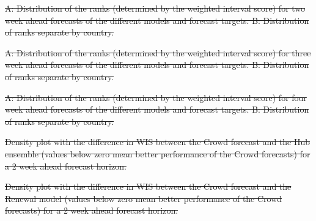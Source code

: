 \documentclass[10pt,letterpaper]{article}
\providecommand{\DIFdeltex}[1]{{\protect\color{red}\sout{#1}}}                      %
\providecommand{\DIFdelFL}[1]{\DIFdel{#1}} %
\providecommand{\DIFdel}[1]{\texorpdfstring{\DIFdeltex{#1}}{}} %
\begin{document}
{%
\DIFdelFL{A: Distribution of the ranks (determined by the weighted interval score) for two week ahead forecasts of the different models and forecast targets. B: Distribution of ranks separate by country.}}%

{%
\DIFdelFL{A: Distribution of the ranks (determined by the weighted interval score) for three week ahead forecasts of the different models and forecast targets. B: Distribution of ranks separate by country.}}%

{%
\DIFdelFL{A: Distribution of the ranks (determined by the weighted interval score) for four week ahead forecasts of the different models and forecast targets. B: Distribution of ranks separate by country.}}%

{%
\DIFdelFL{Density plot with the difference in WIS between the Crowd forecast and the Hub ensemble (values below zero mean better performance of the Crowd forecasts) for a 2 week ahead forecast horizon.}}%

{%
\DIFdelFL{Density plot with the difference in WIS between the Crowd forecast and the Renewal model (values below zero mean better performance of the Crowd forecasts) for a 2 week ahead forecast horizon.}}%
\end{document}

